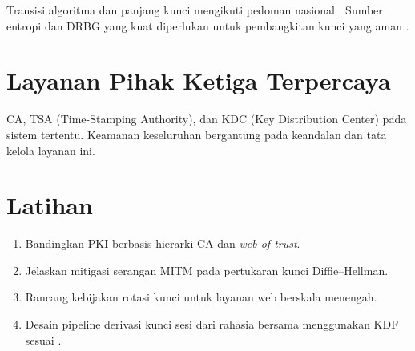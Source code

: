 \documentclass[../main.tex]{subfiles}
\begin{document}
Transisi algoritma dan panjang kunci mengikuti pedoman nasional \citep{nist_sp_800_131a}. Sumber entropi dan DRBG yang kuat diperlukan untuk pembangkitan kunci yang aman \citep{nist_sp_800_90a_r1}.

\section{Layanan Pihak Ketiga Terpercaya}
CA, TSA (Time-Stamping Authority), dan KDC (Key Distribution Center) pada sistem tertentu. Keamanan keseluruhan bergantung pada keandalan dan tata kelola layanan ini.

\section{Latihan}
\begin{enumerate}
  \item Bandingkan PKI berbasis hierarki CA dan \emph{web of trust}.
  \item Jelaskan mitigasi serangan MITM pada pertukaran kunci Diffie--Hellman.
  \item Rancang kebijakan rotasi kunci untuk layanan web berskala menengah.
  \item Desain pipeline derivasi kunci sesi dari rahasia bersama menggunakan KDF sesuai \citep{nist_sp_800_56c_r2}.
\end{enumerate}
\end{document}
